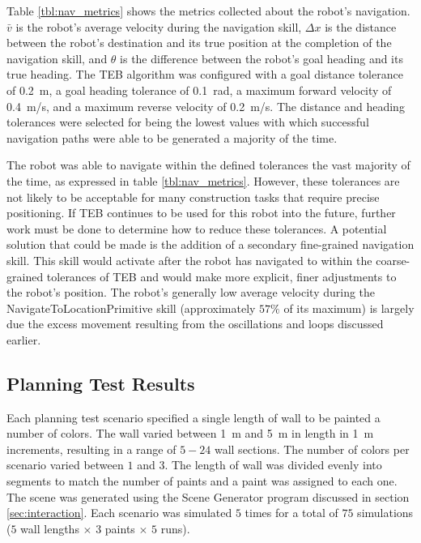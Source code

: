 Table \ref{tbl:nav_metrics} shows the metrics collected about the robot's navigation. $\bar{v}$ is the robot's average velocity during the navigation skill, $\Delta x$ is the distance between the robot's destination and its true position at the completion of the navigation skill, and $\theta$ is the difference between the robot's goal heading and its true heading. The TEB algorithm was configured with a goal distance tolerance of \SI{0.2}{\meter}, a goal heading tolerance of \SI{0.1}{rad}, a maximum forward velocity of \SI{0.4}{\meter/\second}, and a maximum reverse velocity of \SI{0.2}{\meter/\second}. The distance and heading tolerances were selected for being the lowest values with which successful navigation paths were able to be generated a majority of the time.

The robot was able to navigate within the defined tolerances the vast majority of the time, as expressed in table \ref{tbl:nav_metrics}. However, these tolerances are not likely to be acceptable for many construction tasks that require precise positioning. If TEB continues to be used for this robot into the future, further work must be done to determine how to reduce these tolerances. A potential solution that could be made is the addition of a secondary fine-grained navigation skill. This skill would activate after the robot has navigated to within the coarse-grained tolerances of TEB and would make more explicit, finer adjustments to the robot's position. The robot's generally low average velocity during the NavigateToLocationPrimitive skill (approximately $57\%$ of its maximum) is largely due the excess movement resulting from the oscillations and loops discussed earlier.

\subsection{Planning Test Results} \label{sec:results_plan}
Each planning test scenario specified a single length of wall to be painted a number of colors. The wall varied between \SI{1}{m} and \SI{5}{m} in length in \SI{1}{m} increments, resulting in a range of $5-24$ wall sections. The number of colors per scenario varied between $1$ and $3$. The length of wall was divided evenly into segments to match the number of paints and a paint was assigned to each one. The scene was generated using the Scene Generator program discussed in section \ref{sec:interaction}. Each scenario was simulated $5$ times for a total of $75$ simulations ($5$ wall lengths $\times$ $3$ paints $\times$ $5$ runs).

